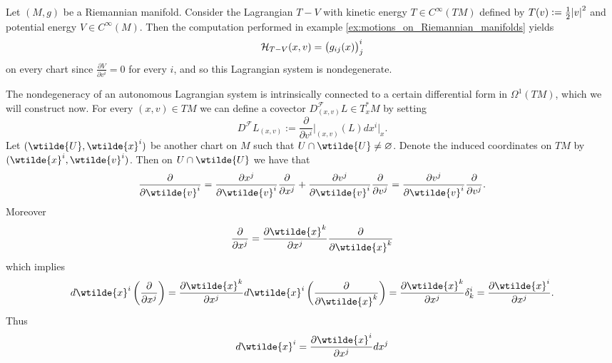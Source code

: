 \begin{example}
	\label{ex:nondegenerate_Lagrangian_system}
	Let $(M,g)$ be a Riemannian manifold. Consider the Lagrangian $T - V$ with kinetic energy $T \in C^\infty(TM)$ defined by $T(v) := \frac{1}{2}\abs{v}^2$ and potential energy $V \in C^\infty(M)$. Then the computation performed in example \ref{ex:motions_on_Riemannian_manifolds} yields
	\begin{equation*}
		\mathcal{H}_{T - V}(x,v) = \del[1]{g_{ij}(x)}^i_j
	\end{equation*} 
	\noindent on every chart since $\frac{\partial V}{\partial v^i} = 0$ for every $i$, and so this Lagrangian system is nondegenerate.
\end{example}

The nondegeneracy of an autonomous Lagrangian system is intrinsically connected to a certain differential form in $\Omega^1(TM)$, which we will construct now. For every $(x,v) \in TM$ we can define a covector $D^\mathcal{F}_{(x,v)} L \in T^*_xM$ by setting
\begin{equation}
	D^\mathcal{F}L_{(x,v)} := \frac{\partial}{\partial v^i}\bigg\vert_{(x,v)}(L) dx^i\vert_x.
\end{equation}
Let $(\wtilde{U},\wtilde{x}^i)$ be another chart on $M$ such that $U \cap \wtilde{U} \neq \varnothing$. Denote the induced coordinates on $TM$ by $(\wtilde{x}^i,\wtilde{v}^i)$. Then on $U \cap \wtilde{U}$ we have that 
\begin{equation*}
	\frac{\partial}{\partial \wtilde{v}^i} = \frac{\partial x^j}{\partial \wtilde{v}^i}\frac{\partial}{\partial x^j} + \frac{\partial v^j}{\partial \wtilde{v}^i}\frac{\partial}{\partial v^j} = \frac{\partial v^j}{\partial \wtilde{v}^i}\frac{\partial}{\partial v^j}.
\end{equation*}
Moreover
\begin{equation*}
	\frac{\partial}{\partial x^j} = \frac{\partial \wtilde{x}^k}{\partial x^j} \frac{\partial}{\partial \wtilde{x}^k}
\end{equation*}
\noindent which implies
\begin{equation*}
	d\wtilde{x}^i \del[3]{\frac{\partial}{\partial x^j}} = \frac{\partial \wtilde{x}^k}{\partial x^j} d\wtilde{x}^i\del[3]{\frac{\partial}{\partial \wtilde{x}^k}} = \frac{\partial \wtilde{x}^k}{\partial x^j}\delta^i_k = \frac{\partial \wtilde{x}^i}{\partial x^j}.
\end{equation*}
Thus
\begin{equation*}
	d\wtilde{x}^i = \frac{\partial \wtilde{x}^i}{\partial x^j} dx^j
\end{equation*}
